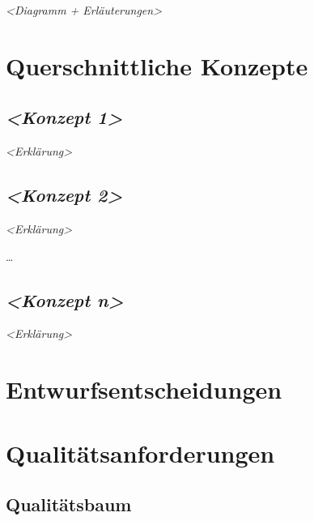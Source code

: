 \documentclass[
]{article}
\begin{document}
\emph{\textless Diagramm + Erläuterungen\textgreater{}}

\hypertarget{section-concepts}{%
\section{Querschnittliche Konzepte}\label{section-concepts}}

\hypertarget{__emphasis_konzept_1_emphasis}{%
\subsection{\texorpdfstring{\emph{\textless Konzept
1\textgreater{}}}{\textless Konzept 1\textgreater{}}}\label{__emphasis_konzept_1_emphasis}}

\emph{\textless Erklärung\textgreater{}}

\hypertarget{__emphasis_konzept_2_emphasis}{%
\subsection{\texorpdfstring{\emph{\textless Konzept
2\textgreater{}}}{\textless Konzept 2\textgreater{}}}\label{__emphasis_konzept_2_emphasis}}

\emph{\textless Erklärung\textgreater{}}

\ldots{}

\hypertarget{__emphasis_konzept_n_emphasis}{%
\subsection{\texorpdfstring{\emph{\textless Konzept
n\textgreater{}}}{\textless Konzept n\textgreater{}}}\label{__emphasis_konzept_n_emphasis}}

\emph{\textless Erklärung\textgreater{}}

\hypertarget{section-design-decisions}{%
\section{Entwurfsentscheidungen}\label{section-design-decisions}}

\hypertarget{section-quality-scenarios}{%
\section{Qualitätsanforderungen}\label{section-quality-scenarios}}

\hypertarget{_qualit_tsbaum}{%
\subsection{Qualitätsbaum}\label{_qualit_tsbaum}}
\end{document}
